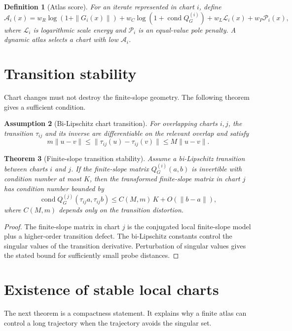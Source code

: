 \documentclass[11pt]{article}
\newtheorem{definition}{Definition}[section]
\newtheorem{assumption}[definition]{Assumption}
\newtheorem{theorem}[definition]{Theorem}
\DeclareMathOperator{\cond}{cond}
\newcommand{\A}{\mathcal{A}}
\newcommand{\Q}{Q_G}
\begin{document}
\begin{definition}[Atlas score]
For an iterate represented in chart $i$, define
\begin{equation}
\A_i(x)=w_R\log(1+\|G_i(x)\|)+w_C\log(1+\cond \Q^{(i)})+w_L\mathcal L_i(x)+w_P\mathcal P_i(x),
\end{equation}
where $\mathcal L_i$ is logarithmic scale energy and $\mathcal P_i$ is an equal-value pole penalty. A dynamic atlas selects a chart with low $\A_i$.
\end{definition}

\section{Transition stability}
Chart changes must not destroy the finite-slope geometry. The following theorem gives a sufficient condition.

\begin{assumption}[Bi-Lipschitz chart transition]
For overlapping charts $i,j$, the transition $\tau_{ij}$ and its inverse are differentiable on the relevant overlap and satisfy
\begin{equation}
    m\|u-v\|\le \|\tau_{ij}(u)-\tau_{ij}(v)\|\le M\|u-v\|.
\end{equation}
\end{assumption}

\begin{theorem}[Finite-slope transition stability]
Assume a bi-Lipschitz transition between charts $i$ and $j$. If the finite-slope matrix $\Q^{(i)}(a,b)$ is invertible with condition number at most $K$, then the transformed finite-slope matrix in chart $j$ has condition number bounded by
\begin{equation}
    \cond \Q^{(j)}(\tau_{ij}a,\tau_{ij}b)\le C(M,m)\,K + O(\|b-a\|),
\end{equation}
where $C(M,m)$ depends only on the transition distortion.
\end{theorem}

\begin{proof}
The finite-slope matrix in chart $j$ is the conjugated local finite-slope model plus a higher-order transition defect. The bi-Lipschitz constants control the singular values of the transition derivative. Perturbation of singular values gives the stated bound for sufficiently small probe distances.
\end{proof}

\section{Existence of stable local charts}
The next theorem is a compactness statement. It explains why a finite atlas can control a long trajectory when the trajectory avoids the singular set.
\end{document}
